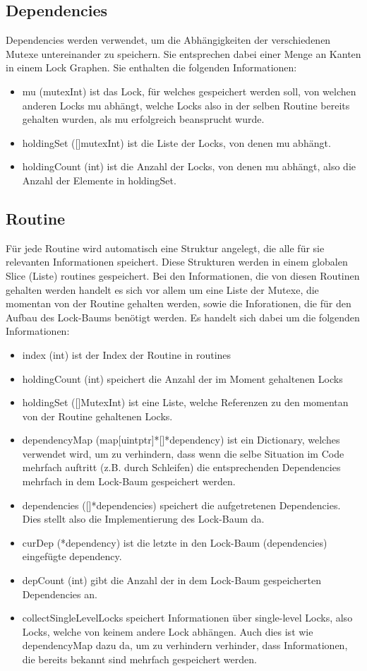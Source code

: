 \subsection{Dependencies}
Dependencies werden verwendet, um die Abhängigkeiten der verschiedenen Mutexe 
untereinander zu speichern. Sie entsprechen dabei einer Menge an Kanten in einem 
Lock Graphen. Sie enthalten die folgenden Informationen:
\begin{itemize}
  \item mu (mutexInt) ist das Lock, für welches gespeichert werden soll, von 
   welchen anderen Locks mu abhängt, welche Locks also in der selben Routine 
   bereits gehalten wurden, als mu erfolgreich beansprucht wurde.
  \item holdingSet ([]mutexInt) ist die Liste der Locks, von denen mu abhängt.
  \item holdingCount (int) ist die Anzahl der Locks, von denen mu abhängt,
   also die Anzahl der Elemente in holdingSet.
\end{itemize}
\subsection{Routine}
Für jede Routine wird automatisch eine Struktur angelegt, die alle für sie 
relevanten Informationen speichert. Diese Strukturen werden in einem 
globalen Slice (Liste) routines gespeichert. Bei den Informationen, die von 
diesen Routinen gehalten werden handelt es 
sich vor allem um eine Liste der Mutexe, die momentan von der Routine 
gehalten werden, sowie die Inforationen, die für den Aufbau des Lock-Baums 
benötigt werden. Es handelt sich dabei um die folgenden Informationen:
\begin{itemize}
  \item index (int) ist der Index der Routine in routines
  \item holdingCount (int) speichert die Anzahl der im Moment gehaltenen Locks
  \item holdingSet ([]MutexInt) ist eine Liste, welche Referenzen zu den 
    momentan von der Routine gehaltenen Locks.
  \item dependencyMap (map[uintptr]*[]*dependency) ist ein Dictionary, welches 
   verwendet wird, um zu verhindern, dass wenn die selbe Situation im Code 
   mehrfach auftritt (z.B. durch Schleifen) die entsprechenden Dependencies 
   mehrfach in dem Lock-Baum gespeichert werden.
  \item dependencies ([]*dependencies) speichert die aufgetretenen Dependencies.
   Dies stellt also die Implementierung des Lock-Baum da.
  \item curDep (*dependency) ist die letzte in den Lock-Baum (dependencies)
   eingefügte dependency.
  \item depCount (int) gibt die Anzahl der in dem Lock-Baum gespeicherten 
   Dependencies an.
  \item collectSingleLevelLocks speichert Informationen über single-level Locks, 
   also Locks, welche von keinem andere Lock abhängen. Auch dies ist wie 
   dependencyMap dazu da, um zu verhindern verhinder, dass Informationen, die
   bereits bekannt sind mehrfach gespeichert werden. 
\end{itemize}

